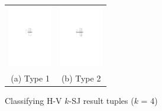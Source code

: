 \documentclass[sigconf]{acmart}
\def\vgap{\vspace{1mm}}
\def\figcapup{\vspace{-0mm}}
\def\figcapdown{\vspace{-0mm}}
\begin{document}
\vgap 
%
%
%

\begin{figure}
    \begin{tabular}{cc}
        \includegraphics[height=27mm]{./artwork/type1} &
        \hspace{5mm} \includegraphics[height=27mm]{./artwork/type2} \\
        (a) Type 1 &
        (b) Type 2
    \end{tabular}

    \figcapup
    \caption{Classifying H-V $k$-SJ result tuples ($k$ = 4)}
    \label{fig:hv:types}
    \figcapdown
\end{figure}
\end{document}
